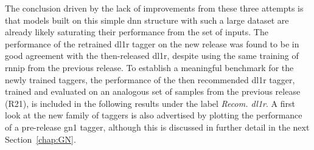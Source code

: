 The conclusion driven by the lack of improvements from these three attempts is that models built on this simple \gls{dnn} structure with such a large dataset are already likely saturating their performance from the set of inputs. The performance of the retrained \gls{dl1r} tagger on the new release was found to be in good agreement with the then-released \gls{dl1r}, despite using the same training of \gls{rnnip} from the previous release. To establish a meaningful benchmark for the newly trained taggers, the performance of the then recommended \gls{dl1r} tagger, trained and evaluated on an analogous set of samples from the previous release (R21), is included in the following results under the label \textit{Recom. \gls{dl1r}}. A first look at the new family of taggers is also advertised by plotting the performance of a pre-release \gls{gn1} tagger, although this is discussed in further detail in the next Section~\ref{chap:GN}. 

